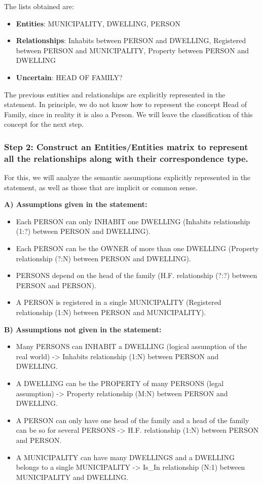 \documentclass{article}
\begin{document}
The lists obtained are:

\begin{itemize}
    \item \textbf{Entities}: MUNICIPALITY, DWELLING, PERSON
    \item \textbf{Relationships}: Inhabits between PERSON and DWELLING, Registered between PERSON and MUNICIPALITY, Property between PERSON and DWELLING
    \item \textbf{Uncertain}: HEAD OF FAMILY?
\end{itemize}

The previous entities and relationships are explicitly represented in the statement.  In principle, we do not know how to represent the concept Head of Family, since in reality it is also a Person.  We will leave the classification of this concept for the next step.

\subsubsection*{Step 2: Construct an Entities/Entities matrix to represent all the relationships along with their correspondence type.}

For this, we will analyze the semantic assumptions explicitly represented in the statement, as well as those that are implicit or common sense.

\textbf{A) Assumptions given in the statement:}

\begin{itemize}
    \item Each PERSON can only INHABIT one DWELLING (Inhabits relationship (1:?) between PERSON and DWELLING).
    \item Each PERSON can be the OWNER of more than one DWELLING (Property relationship (?:N) between PERSON and DWELLING).
    \item PERSONS depend on the head of the family (H.F. relationship (?:?) between PERSON and PERSON).
    \item A PERSON is registered in a single MUNICIPALITY (Registered relationship (1:N) between PERSON and MUNICIPALITY).
\end{itemize}

\textbf{B) Assumptions not given in the statement:}

\begin{itemize}
    \item Many PERSONS can INHABIT a DWELLING (logical assumption of the real world) -> Inhabits relationship (1:N) between PERSON and DWELLING.
    \item A DWELLING can be the PROPERTY of many PERSONS (legal assumption) -> Property relationship (M:N) between PERSON and DWELLING.
    \item A PERSON can only have one head of the family and a head of the family can be so for several PERSONS -> H.F. relationship (1:N) between PERSON and PERSON.
    \item A MUNICIPALITY can have many DWELLINGS and a DWELLING belongs to a single MUNICIPALITY -> Is\_In relationship (N:1) between MUNICIPALITY and DWELLING.
\end{itemize}
\end{document}
